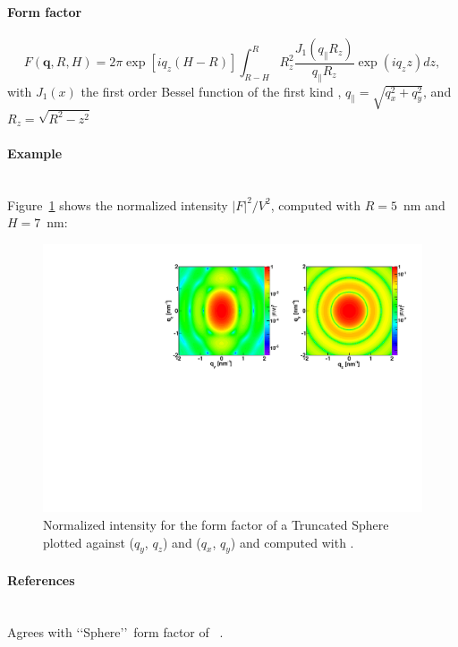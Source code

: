 \paragraph{Form factor}
\begin{equation*}  
F(\mathbf{q},R, H)= 2\pi \exp[i q_z (H-R)]\int_{R-H} ^{R} R_z^2 \frac{J_1(q_{\parallel} R_z) }{q_{\parallel} R_z} \exp(i q_z z) dz,
\end{equation*}
with $J_1(x)$ the first order
Bessel function of the first kind \cite{AbSt64}, $q_{\parallel} =
\sqrt{q_x^2+q_y^2}$, and $R_z = \sqrt{R^2-z^2}$


\paragraph{Example}\strut\\
Figure~\ref{fig:SphereEx} shows the normalized intensity $|F|^2/V^2$, computed with $R=5$~nm and $H=7$~nm:
\begin{figure}[h]
\begin{center}
\includegraphics[angle=-90,width=\textwidth]{fig/ff/figffsphere.pdf}
\end{center}
\caption{Normalized intensity for the form factor of a Truncated Sphere plotted against ($q_y$, $q_z$) and ($q_x$, $q_y$) and
  computed with .}
\label{fig:SphereEx}
\end{figure}

\paragraph{References}\strut\\
Agrees with \lq\lq Sphere\rq\rq\ form factor of \IsGISAXS~\cite{Laz02}.

